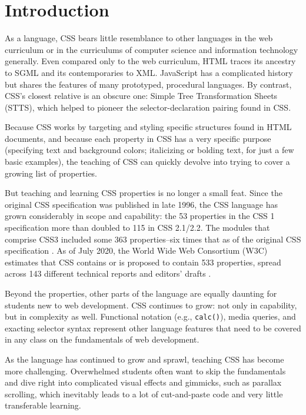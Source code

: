 \documentclass[sigconf,sigplan,review,anonymous]{acmart}
\begin{document}
\section{Introduction}

As a language, CSS bears little resemblance to other languages in the web curriculum or in the curriculums of computer science and information technology generally. Even compared only to the web curriculum, HTML traces its ancestry to SGML and its contemporaries to XML. JavaScript has a complicated history but shares the features of many prototyped, procedural languages. By contrast, CSS’s closest relative is an obscure one: Simple Tree Transformation Sheets (STTS)\cite{w3c:briefhistory}, which helped to pioneer the 
    selector-\linebreak declaration pairing found in CSS.

Because CSS works by targeting and styling specific structures found in HTML documents, and because each property in CSS has a very specific purpose (specifying text and background colors; italicizing or bolding text, for just a few basic examples), the teaching of CSS can quickly devolve into trying to cover a growing list of properties.

But teaching and learning CSS properties is no longer a small feat. Since the original CSS specification was published in late 1996, the CSS language has grown considerably in scope and capability: the 53 properties in the CSS 1 specification more than doubled to 115 in CSS 2.1/2.2. The modules that comprise CSS3 included some 363 properties--six times that as of the original CSS specification \cite{jom:css}. As of July 2020, the World Wide Web Consortium (W3C) estimates that CSS contains or is proposed to contain 533 properties, spread across 143 different technical reports and editors' drafts \cite{w3c:iop}.

Beyond the properties, other parts of the language are equally daunting for students new to web development. CSS continues to grow: not only in capability, but in complexity as well. Functional notation (e.g., \verb|calc()|), media queries, and exacting selector syntax represent other language features that need to be covered in any class on the fundamentals of web development.

As the language has continued to grow and sprawl, teaching CSS has become more challenging. Overwhelmed students often want to skip the fundamentals and dive right into complicated visual effects and gimmicks, such as parallax scrolling, which inevitably leads to a lot of cut-and-paste code and very little transferable learning.
\end{document}
